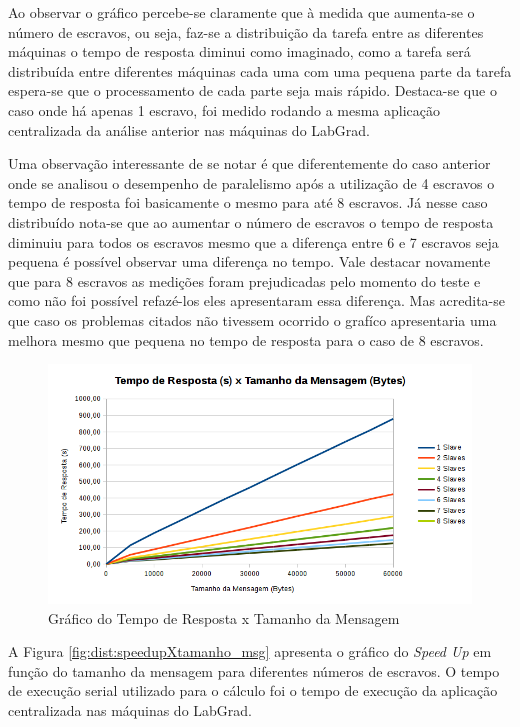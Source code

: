 \documentclass[
	12pt,				%
    oneside,			%
	a4paper,			%
	english,			%
	brazil,				%
	]{abntex2}
\begin{document}
Ao observar o gráfico percebe-se claramente que à medida que aumenta-se o número de escravos, ou seja, faz-se a distribuição da tarefa entre as diferentes máquinas o tempo de resposta diminui como imaginado, como a tarefa será distribuída entre 
diferentes máquinas cada uma com uma pequena parte da tarefa espera-se que o processamento de cada parte seja mais rápido.
Destaca-se que o caso onde há apenas 1 escravo, foi medido rodando a mesma aplicação centralizada da análise anterior nas máquinas do LabGrad.

Uma observação interessante de se notar é que diferentemente do caso anterior onde se analisou o desempenho de paralelismo após a utilização de 4 escravos o tempo de resposta foi basicamente o mesmo para até 8 escravos. Já nesse caso distribuído 
nota-se que ao aumentar o número de escravos o tempo de resposta diminuiu para todos os escravos mesmo que a diferença entre 6 e 7 escravos seja pequena é possível observar uma diferença no tempo. Vale destacar novamente que para 8 escravos as medições foram prejudicadas pelo momento do teste e como não foi possível refazé-los eles apresentaram essa diferença. Mas acredita-se
que caso os problemas citados não tivessem ocorrido o grafíco apresentaria uma melhora mesmo que pequena no tempo de resposta
para o caso de 8 escravos.

\begin{figure}[!htb]
\centering
\includegraphics[scale=0.65]{figuras/temporesposta_distribuido.png}
\caption{Gráfico do Tempo de Resposta x Tamanho da Mensagem}
\label{fig:dist:tempo_respostaXtamanho_msg}
\end{figure}

A Figura \ref{fig:dist:speedupXtamanho_msg} apresenta o gráfico do \textit{Speed Up} em função do tamanho da mensagem para diferentes números de escravos. O tempo de execução serial utilizado para o cálculo foi o tempo de execução da aplicação centralizada nas máquinas do LabGrad.
\end{document}
